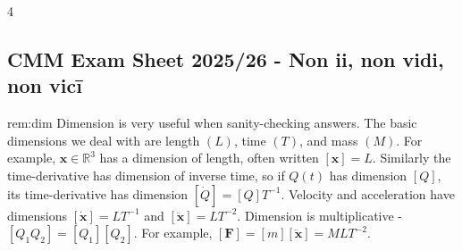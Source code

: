 \documentclass[landscape, 8pt]{extarticle}
\begin{document}
	
	\fontsize{5pt}{6pt} \selectfont
	
	\setlength\tabcolsep{4.5pt}
	\setlength\extrarowheight{2pt}
	
	\setlength{\abovedisplayskip}{0pt}
	\setlength{\belowdisplayskip}{0pt}
	\setlength{\abovedisplayshortskip}{0pt}
	\setlength{\belowdisplayshortskip}{0pt}
	
	\begin{multicols*}{4}
		\raggedcolumns 
		\vspace{-5pt}
		\subsection*{CMM Exam Sheet 2025/26 - Non ii, non vidi, non vicī}
		\vspace{-5pt}
		
		
		\begin{rem}[Dimension]{rem:dim}{ }
			Dimension is very useful when sanity-checking answers. The basic dimensions we deal with are length $(L)$, time $(T)$, and mass $(M)$. For example, $\bm{x}\in \mathbb{R}^3$ has a dimension of length, often written $[\bm{x}] = L$. Similarly the time-derivative has dimension of inverse time, so if $Q(t)$ has dimension $[Q]$, its time-derivative has dimension $[\dot{Q}] = [Q]T^{-1}$. Velocity and acceleration have dimensions $[\bm{\dot{x}}] = LT^{-1}$ and $[\bm{\ddot{x}}] = LT^{-2}$. Dimension is multiplicative - $[Q_1Q_2] = [Q_1][Q_2]$. For example, $[\bm{F}] = [m][\bm{\ddot{x}}] = MLT^{-2}$.
			
		\end{rem}
		

\end{multicols*}
\end{document}
